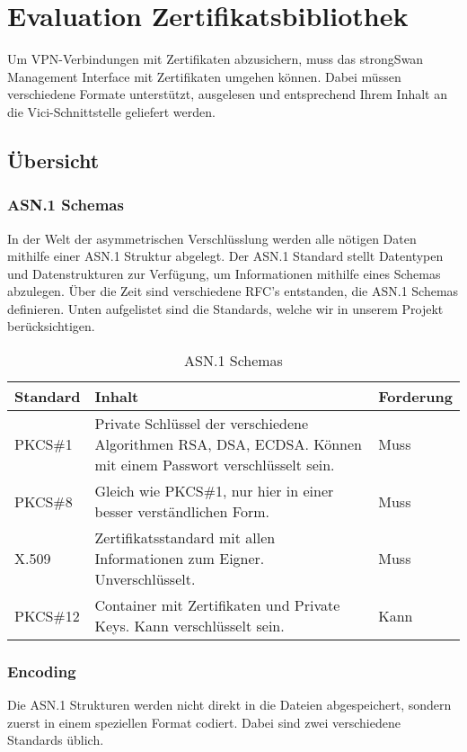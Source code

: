 \section{Evaluation Zertifikatsbibliothek}
Um VPN-Verbindungen mit Zertifikaten abzusichern, muss das strongSwan Management Interface mit Zertifikaten umgehen können. Dabei müssen verschiedene Formate unterstützt, ausgelesen und entsprechend Ihrem Inhalt an die Vici-Schnittstelle geliefert werden.
\subsection{Übersicht}
\subsubsection{ASN.1 Schemas}
In der Welt der asymmetrischen Verschlüsslung werden alle nötigen Daten mithilfe einer ASN.1 Struktur abgelegt. Der ASN.1 Standard stellt Datentypen und Datenstrukturen zur Verfügung, um Informationen mithilfe eines Schemas abzulegen. Über die Zeit sind verschiedene RFC’s entstanden, die ASN.1 Schemas definieren. Unten aufgelistet sind die Standards, welche wir in unserem Projekt berücksichtigen. \medskip

\begin{table}[H]
\centering
    \begin{tabular}{|l|p{12cm}|l|}
    \hline
    \rowcolor{lightblue}
    Standard & Inhalt & Forderung   \\ \hline
	PKCS\#1	&	Private Schlüssel der verschiedene Algorithmen RSA, DSA, ECDSA. Können mit einem Passwort verschlüsselt sein.	& Muss \\ \hline	
		PKCS\#8	&	Gleich wie PKCS\#1, nur hier in einer besser verständlichen Form.	& Muss \\ \hline	
		X.509	&	Zertifikatsstandard mit allen Informationen zum Eigner. Unverschlüsselt.	& Muss \\ \hline
		PKCS\#12	&	Container mit Zertifikaten und Private Keys. Kann verschlüsselt sein.	& Kann \\ \hline		
	\end{tabular}
    \caption[ASN.1 Schemas]{ASN.1 Schemas}
\end{table}

\subsubsection{Encoding}
Die ASN.1 Strukturen werden nicht direkt in die Dateien abgespeichert, sondern zuerst in einem speziellen Format codiert. Dabei sind zwei verschiedene Standards üblich. \medskip

